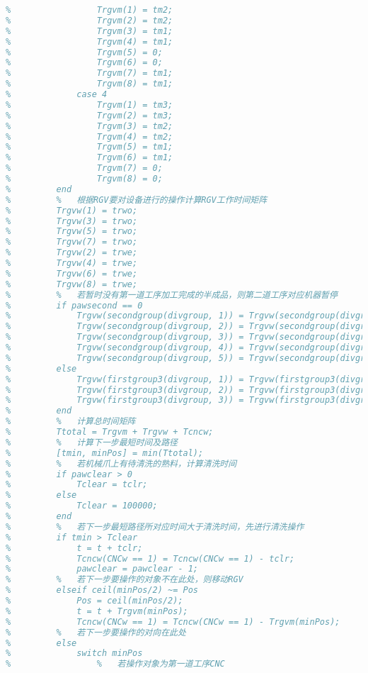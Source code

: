 \documentclass[no-math,withoutpreface,bwprint]{cumcmthesis} %
\numberwithin{equation}{section}
\numberwithin{figure}{section}
\numberwithin{table}{section}
\begin{document}
\begin{lstlisting}[language=matlab]
%             case 3
%                 Trgvm(1) = tm2;
%                 Trgvm(2) = tm2;
%                 Trgvm(3) = tm1;
%                 Trgvm(4) = tm1;
%                 Trgvm(5) = 0;
%                 Trgvm(6) = 0;
%                 Trgvm(7) = tm1;
%                 Trgvm(8) = tm1;
%             case 4
%                 Trgvm(1) = tm3;
%                 Trgvm(2) = tm3;
%                 Trgvm(3) = tm2;
%                 Trgvm(4) = tm2;
%                 Trgvm(5) = tm1;
%                 Trgvm(6) = tm1;
%                 Trgvm(7) = 0;
%                 Trgvm(8) = 0;        
%         end
%         %   根据RGV要对设备进行的操作计算RGV工作时间矩阵
%         Trgvw(1) = trwo;
%         Trgvw(3) = trwo;
%         Trgvw(5) = trwo;
%         Trgvw(7) = trwo;
%         Trgvw(2) = trwe;
%         Trgvw(4) = trwe;
%         Trgvw(6) = trwe;
%         Trgvw(8) = trwe;
%         %   若暂时没有第一道工序加工完成的半成品，则第二道工序对应机器暂停
%         if pawsecond == 0
%             Trgvw(secondgroup(divgroup, 1)) = Trgvw(secondgroup(divgroup, 1)) + 100000;
%             Trgvw(secondgroup(divgroup, 2)) = Trgvw(secondgroup(divgroup, 2)) + 100000;
%             Trgvw(secondgroup(divgroup, 3)) = Trgvw(secondgroup(divgroup, 3)) + 100000;
%             Trgvw(secondgroup(divgroup, 4)) = Trgvw(secondgroup(divgroup, 4)) + 100000;
%             Trgvw(secondgroup(divgroup, 5)) = Trgvw(secondgroup(divgroup, 5)) + 100000;
%         else
%             Trgvw(firstgroup3(divgroup, 1)) = Trgvw(firstgroup3(divgroup, 1)) + 100000;
%             Trgvw(firstgroup3(divgroup, 2)) = Trgvw(firstgroup3(divgroup, 2)) + 100000;
%             Trgvw(firstgroup3(divgroup, 3)) = Trgvw(firstgroup3(divgroup, 3)) + 100000;
%         end
%         %   计算总时间矩阵
%         Ttotal = Trgvm + Trgvw + Tcncw;
%         %   计算下一步最短时间及路径
%         [tmin, minPos] = min(Ttotal);
%         %   若机械爪上有待清洗的熟料，计算清洗时间
%         if pawclear > 0
%             Tclear = tclr;
%         else
%             Tclear = 100000;
%         end
%         %   若下一步最短路径所对应时间大于清洗时间，先进行清洗操作
%         if tmin > Tclear
%             t = t + tclr;
%             Tcncw(CNCw == 1) = Tcncw(CNCw == 1) - tclr;
%             pawclear = pawclear - 1;
%         %   若下一步要操作的对象不在此处，则移动RGV
%         elseif ceil(minPos/2) ~= Pos
%             Pos = ceil(minPos/2);
%             t = t + Trgvm(minPos);
%             Tcncw(CNCw == 1) = Tcncw(CNCw == 1) - Trgvm(minPos);
%         %   若下一步要操作的对向在此处
%         else
%             switch minPos
%                 %   若操作对象为第一道工序CNC

\end{lstlisting}
\end{document}
